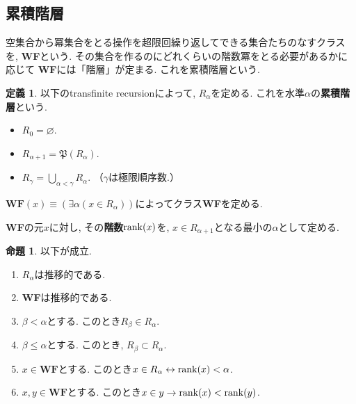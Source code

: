 \documentclass[a4paper, twoside]{bxjsarticle}
\theoremstyle{definition}
\newtheorem{prop}[thm]{命題}
\newtheorem{defn}[thm]{定義}
\begin{document}
    \subsection{累積階層}
        空集合から冪集合をとる操作を超限回繰り返してできる集合たちのなすクラスを, \textbf{WF}という. その集合を作るのにどれくらいの階数冪をとる必要があるかに応じて \textbf{WF}には「階層」が定まる.
        これを累積階層という.  
            
         \begin{defn}
            以下のtransfinite recursionによって,  $R_\alpha$を定める. これを水準$\alpha$の\textbf{累積階層}という.
            \begin{itemize}
                \item $R_0=\varnothing$.
                \item $R_{\alpha+1}=\mathfrak{P}(R_\alpha)$.
                \item $R_\gamma=\bigcup_{\alpha<\gamma}R_\alpha$. （$\gamma$は極限順序数.） 
            \end{itemize}
            
            $\textbf{WF}(x)\equiv(\exists\alpha(x\in R_\alpha))$によってクラス\textbf{WF}を定める. 
            
            \textbf{WF}の元$x$に対し, その\textbf{階数}${\rm rank}(x)$を, $x\in R_{\alpha+1}$となる最小の$\alpha$として定める.
         \end{defn}
         \begin{prop}
         以下が成立.
             \begin{enumerate}
                 \item $R_\alpha$は推移的である.
                 \item \textbf{WF}は推移的である.
                 \item $\beta<\alpha$とする. このとき$R_\beta\in R_\alpha$.
                 \item $\beta\leq\alpha$とする. このとき, $R_\beta\subset R_\alpha$.
                 \item $x\in \textbf{WF}$とする. このとき$x\in R_\alpha \leftrightarrow {\rm rank}(x)<\alpha$.
                 \item $x, y\in \textbf{WF}$とする. このとき$x\in y \to {\rm rank}(x)<{\rm rank}(y)$.
             \end{enumerate}
         \end{prop}
\end{document}
